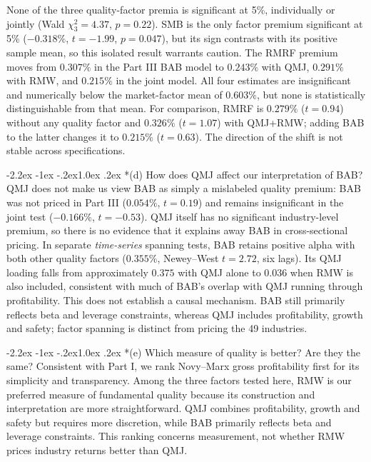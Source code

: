 \documentclass[11pt]{article}
\makeatletter
\renewcommand\subsection{\@startsection{subsection}{2}{0pt}%
  {-2.2ex \@plus -1ex \@minus -.2ex}{1.0ex \@plus .2ex}%
  {\normalfont\bfseries\normalsize\color{psink}}}
\makeatother
\begin{document}
\noindent None of the three quality-factor premia is significant at 5\%, individually
or jointly (Wald $\chi^2_3=4.37$, $p=0.22$). SMB is the only factor premium
significant at 5\% ($-0.318\%$, $t=-1.99$, $p=0.047$), but its sign
contrasts with its positive sample mean, so this isolated result warrants caution. The RMRF premium moves from $0.307\%$ in the
Part III BAB model to $0.243\%$ with QMJ, $0.291\%$ with RMW, and $0.215\%$
in the joint model. All four estimates are insignificant and numerically below
the market-factor mean of $0.603\%$, but none is statistically distinguishable
from that mean. For comparison, RMRF is $0.279\%$ ($t=0.94$) without any
quality factor and $0.326\%$ ($t=1.07$) with QMJ+RMW; adding BAB to the
latter changes it to $0.215\%$ ($t=0.63$). The direction of the shift is
not stable across specifications.

\subsection*{(d) How does QMJ affect our interpretation of BAB?}
QMJ does not make us view BAB as simply a mislabeled quality premium: BAB was
not priced in Part III ($0.054\%$, $t=0.19$) and remains insignificant in the
joint test ($-0.166\%$, $t=-0.53$). QMJ itself has no significant
industry-level premium, so there is no evidence that it explains away BAB in
cross-sectional pricing. In separate \emph{time-series} spanning tests, BAB
retains positive alpha with both other quality factors ($0.355\%$,
Newey--West $t=2.72$, six lags). Its QMJ loading falls from approximately
$0.375$ with QMJ alone to $0.036$ when RMW is also included, consistent with
much of BAB's overlap with QMJ running through profitability. This does not
establish a causal mechanism. BAB still primarily reflects beta and leverage
constraints, whereas QMJ includes profitability, growth and safety; factor
spanning is distinct from pricing the 49 industries.

\subsection*{(e) Which measure of quality is better? Are they the same?}
Consistent with Part I, we rank Novy--Marx gross profitability first for
its simplicity and transparency. Among the three factors tested here, RMW
is our preferred measure of fundamental quality because its construction
and interpretation are more straightforward. QMJ combines profitability,
growth and safety but requires more discretion, while BAB primarily reflects
beta and leverage constraints. This ranking concerns measurement, not
whether RMW prices industry returns better than QMJ.
\end{document}
